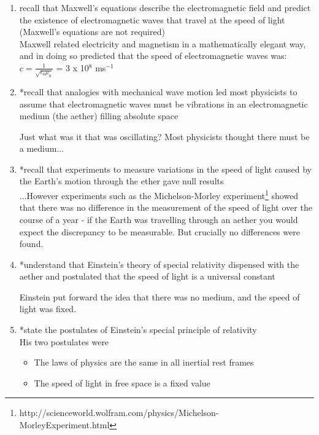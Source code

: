 \documentclass[main.tex]{subfiles}
\begin{document}
\begin{enumerate}
	
\item recall that Maxwell’s equations describe the electromagnetic field and predict the existence of
electromagnetic waves that travel at the speed of light (Maxwell’s equations are not required)
\\

Maxwell related electricity and magnetism in a mathematically elegant way, and in doing so predicted that the speed of electromagnetic waves was:
\\
 
$c=\frac{1}{\sqrt{\epsilon_0\mu_0}}$ = 3 x 10$^8$ ms$^{-1}$



\item *recall that analogies with mechanical wave motion led most physicists to assume that electromagnetic
waves must be vibrations in an electromagnetic medium (the aether) filling absolute space

Just what was it that was oscillating? Most physicists thought there must be a medium...

\item *recall that experiments to measure variations in the speed of light caused by the Earth’s motion
through the ether gave null results
\\

...However experiments such as the Michelson-Morley experiment\footnote{http://scienceworld.wolfram.com/physics/Michelson-MorleyExperiment.html} showed that there was no difference in the measurement of the speed of light over the course of a year - if the Earth was travelling through an aether you would expect the discrepancy to be measurable. But crucially no differences were found.
\\
\item *understand that Einstein’s theory of special relativity dispensed with the aether and postulated that the
speed of light is a universal constant

Einstein put forward the idea that there was no medium, and the speed of light was fixed.
\\
\item *state the postulates of Einstein’s special principle of relativity
\\

His two postulates were 
\begin{itemize}
	\item The laws of physics are the same in all inertial rest frames
	\item The speed of light in free space is a fixed value
\end{itemize}


\end{enumerate}
\end{document}
